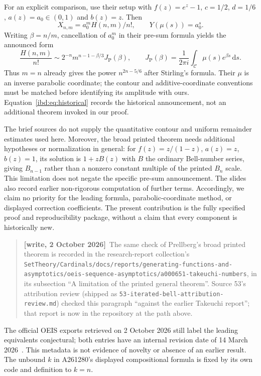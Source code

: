\documentclass[11pt,letterpaper]{article}
\theoremstyle{remark}\newtheorem{remark}[theorem]{Remark}
\newcommand{\dd}{\,\mathrm d}
\newcommand{\JP}{J_{\mathrm P}}
\newenvironment{writenote}{\par\smallskip\begin{quote}\small\textbf{[write, 2 October 2026]}\ }{\end{quote}\smallskip}
\newcommand{\repopath}[1]{\nolinkurl{#1}}
\begin{document}
For an explicit comparison, use their setup with $f(z)=e^z-1$, $c=1/2$, $d=1/6$, $a(z)=a_0\in(0,1)$ and $b(z)=z$. Then
\[
 X_{n,m}=a_0^m H(n,m)/n!,\qquad Y(\mu(s))=a_0^s.
\]
Writing $\beta=n/m$, cancellation of $a_0^m$ in their pre-sum formula yields the announced form
\begin{equation}\label{ibd:eq:historical}
 \frac{H(n,m)}{n!}\sim 2^{-n}m^{n-1-\beta/3}\JP(\beta),
 \qquad \JP(\beta)=\frac1{2\pi i}\int_{\mathcal C}\mu(s)e^{\beta s}\dd s.
\end{equation}
Thus $m=n$ already gives the power $n^{2n-5/6}$ after Stirling's formula. Their $\mu$ is an inverse parabolic coordinate; the contour and additive-coordinate conventions must be matched before identifying its amplitude with ours. Equation~\eqref{ibd:eq:historical} records the historical announcement, not an additional theorem invoked in our proof.

The brief sources do not supply the quantitative contour and uniform remainder estimates used here. Moreover, the broad printed theorem needs additional hypotheses or normalization in general: for $f(z)=z/(1-z)$, $a(z)=z$, $b(z)=1$, its solution is $1+zB(z)$ with $B$ the ordinary Bell-number series, giving $B_{n-1}$ rather than a nonzero constant multiple of the printed $B_n$ scale. This limitation does not negate the specific pre-sum announcement. The slides also record earlier non-rigorous computation of further terms. Accordingly, we claim no priority for the leading formula, parabolic-coordinate method, or displayed correction coefficients. The present contribution is the fully specified proof and reproducibility package, without a claim that every component is historically new.
\begin{writenote}The same check of Prellberg's broad printed theorem is recorded in the research-report collection's \repopath{SetTheory/Cardinals/docs/reports/generating-functions-and-asymptotics/oeis-sequence-asymptotics/a000651-takeuchi-numbers}, in its subsection ``A limitation of the printed general theorem''. Source 53's attribution review (shipped as \texttt{53-iterated-bell-attribution-review.md}) checked this paragraph ``against the earlier Takeuchi report''; that report is now in the repository at the path above.\end{writenote}

The official OEIS exports retrieved on 2 October 2026 still label the leading equivalents conjectural; both entries have an internal revision date of 14 March 2026~\cite{oeisA,oeisB}. This metadata is not evidence of novelty or absence of an earlier result. The unbound $k$ in A261280's displayed compositional formula is fixed by its own code and definition to $k=n$.
\end{document}
